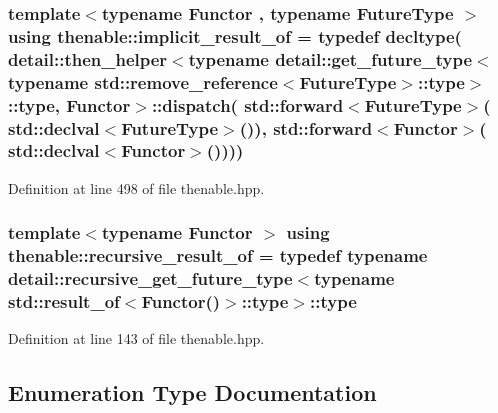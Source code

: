 \subsubsection[{\texorpdfstring{implicit\+\_\+result\+\_\+of}{implicit_result_of}}]{\setlength{\rightskip}{0pt plus 5cm}template$<$typename Functor , typename Future\+Type $>$ using {\bf thenable\+::implicit\+\_\+result\+\_\+of} = typedef decltype( detail\+::then\+\_\+helper$<$typename detail\+::get\+\_\+future\+\_\+type$<$typename std\+::remove\+\_\+reference$<$Future\+Type$>$\+::type$>$\+::type, Functor$>$\+::dispatch( std\+::forward$<$Future\+Type$>$( std\+::declval$<$Future\+Type$>$()), std\+::forward$<$Functor$>$( std\+::declval$<$Functor$>$())))}\hypertarget{namespacethenable_a1ecf08d6ad8b8688d7b4df047b5feaae}{}\label{namespacethenable_a1ecf08d6ad8b8688d7b4df047b5feaae}


Definition at line 498 of file thenable.\+hpp.

\subsubsection[{\texorpdfstring{recursive\+\_\+result\+\_\+of}{recursive_result_of}}]{\setlength{\rightskip}{0pt plus 5cm}template$<$typename Functor $>$ using {\bf thenable\+::recursive\+\_\+result\+\_\+of} = typedef typename detail\+::recursive\+\_\+get\+\_\+future\+\_\+type$<$typename std\+::result\+\_\+of$<$Functor()$>$\+::type$>$\+::type}\hypertarget{namespacethenable_ae5c96f83512d34d52e355cacdec0eb02}{}\label{namespacethenable_ae5c96f83512d34d52e355cacdec0eb02}


Definition at line 143 of file thenable.\+hpp.



\subsection{Enumeration Type Documentation}
